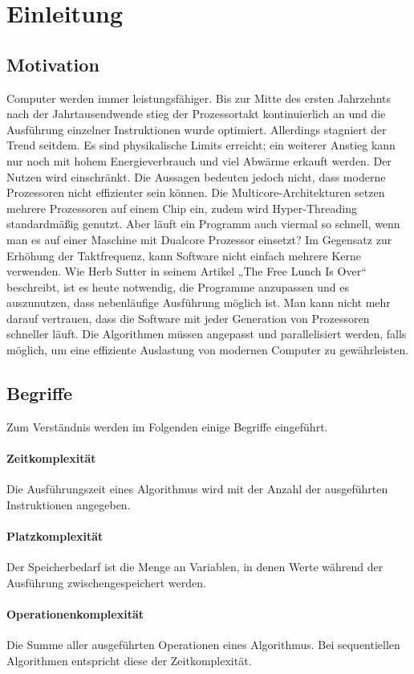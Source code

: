 \section{Einleitung}

\subsection{Motivation}
Computer werden immer leistungsfähiger.
Bis zur Mitte des ersten Jahrzehnts nach der Jahrtausendwende stieg der
Prozessortakt kontinuierlich an und die Ausführung einzelner Instruktionen
wurde optimiert.
Allerdings stagniert der Trend seitdem.
Es sind physikalische Limits erreicht; ein weiterer Anstieg kann nur noch
mit hohem Energieverbrauch und viel Abwärme erkauft werden.
Der Nutzen wird einschränkt.
Die Aussagen bedeuten jedoch nicht, dass moderne Prozessoren nicht effizienter
sein können.
Die Multicore-Architekturen setzen mehrere Prozessoren auf einem Chip ein,
zudem wird Hyper-Threading standardmäßig genutzt.
Aber läuft ein Programm auch viermal so schnell, wenn man es auf einer Maschine
mit Dualcore Prozessor einsetzt?
Im Gegensatz zur Erhöhung der Taktfrequenz, kann Software nicht einfach mehrere
Kerne verwenden.
Wie Herb Sutter in seinem Artikel „The Free Lunch Is Over“
\cite{sutterlunch} beschreibt, ist es heute notwendig, die Programme anzupassen
und es auszunutzen, dass nebenläufige Ausführung möglich ist.
Man kann nicht mehr darauf vertrauen, dass die Software mit jeder Generation
von Prozessoren schneller läuft.
Die Algorithmen müssen angepasst und parallelisiert werden, falls möglich, um
eine effiziente Auslastung von modernen Computer zu gewährleisten.

\subsection{Begriffe}
Zum Verständnis werden im Folgenden einige Begriffe eingeführt.

\paragraph{Zeitkomplexität}
Die Ausführungszeit eines Algorithmus wird mit der Anzahl der ausgeführten Instruktionen angegeben.

\paragraph{Platzkomplexität}
Der Speicherbedarf ist die Menge an Variablen, in denen Werte während der Ausführung zwischengespeichert werden.

\paragraph{Operationenkomplexität}
Die Summe aller ausgeführten Operationen eines Algorithmus. Bei sequentiellen Algorithmen entspricht diese der Zeitkomplexität.
